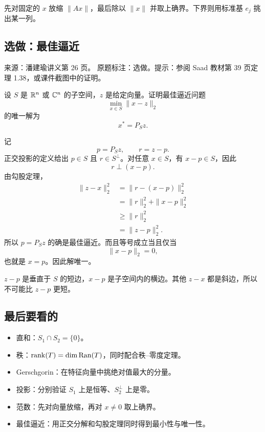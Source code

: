 \begin{dxtips}[从向量范数到矩阵范数]\label{hw:matrix:tip8}
先对固定的 $x$ 放缩 $\|Ax\|$，最后除以 $\|x\|$ 并取上确界。下界则用标准基 $e_j$ 挑出某一列。
\end{dxtips}

\subsection*{选做：最佳逼近}

\begin{homework}[第 9 题（选做）：定理 1.42]
\par\smallskip\textsf{来源：潘建瑜讲义第 26 页。}
原题标注：选做。提示：参阅 Saad 教材第 39 页定理 1.38，或课件截图中的证明。\par\smallskip

设 $S$ 是 $\mathbb{R}^n$ 或 $\mathbb{C}^n$ 的子空间，$z$ 是给定向量。证明最佳逼近问题
\[
\min_{x\in S}\|x-z\|_2
\]
的唯一解为
\[
x^*=P_Sz.
\]
\end{homework}

\begin{solution}
记
\[
p=P_Sz,
\qquad
r=z-p.
\]
正交投影的定义给出 $p\in S$ 且 $r\in S^\perp$。对任意 $x\in S$，有 $x-p\in S$，因此
\[
r\perp(x-p).
\]
由勾股定理，
\begin{align*}
\|z-x\|_2^2
&=\|r-(x-p)\|_2^2\\
&=\|r\|_2^2+\|x-p\|_2^2\\
&\ge\|r\|_2^2\\
&=\|z-p\|_2^2.
\end{align*}
所以 $p=P_Sz$ 的确是最佳逼近。而且等号成立当且仅当
\[
\|x-p\|_2=0,
\]
也就是 $x=p$。因此解唯一。
\end{solution}

\begin{dxtips}[几何图像]\label{hw:matrix:tip9}
$z-p$ 是垂直于 $S$ 的短边，$x-p$ 是子空间内的横边。其他 $z-x$ 都是斜边，所以不可能比 $z-p$ 更短。
\end{dxtips}

\subsection*{最后要看的}
{}

\begin{itemize}
  \item 直和：$S_1\cap S_2=\{0\}$。
  \item 秩：$\operatorname{rank}(T)=\dim\operatorname{Ran}(T)$，同时配合秩--零度定理。
  \item Gerschgorin：在特征向量中挑绝对值最大的分量。
  \item 投影：分别验证 $S_1$ 上是恒等、$S_2^\perp$ 上是零。
  \item 范数：先对向量放缩，再对 $x\ne0$ 取上确界。
  \item 最佳逼近：用正交分解和勾股定理同时得到最小性与唯一性。
\end{itemize}


